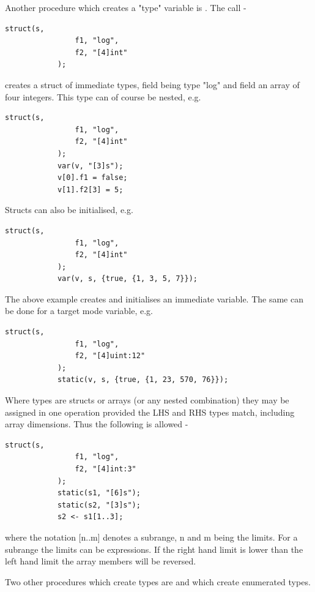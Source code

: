         Another procedure which creates a "type" variable is .
        The call -
        \begin{lstlisting}[language=threepl]
            struct(s,
                f1, "log",
                f2, "[4]int"
            );
        \end{lstlisting}
        creates a struct of immediate types, field  being type "log"
        and field  an array of four integers. This type can of course be
        nested, e.g.
        \begin{lstlisting}[language=threepl]
            struct(s,
                f1, "log",
                f2, "[4]int"
            );
            var(v, "[3]s");
            v[0].f1 = false;
            v[1].f2[3] = 5;
        \end{lstlisting}
        Structs can also be initialised, e.g.
        \begin{lstlisting}[language=threepl]
            struct(s,
                f1, "log",
                f2, "[4]int"
            );
            var(v, s, {true, {1, 3, 5, 7}});
        \end{lstlisting}

        The above example creates and initialises an immediate variable. The same
        can be done for a target mode variable, e.g.
        \begin{lstlisting}[language=threepl]
            struct(s,
                f1, "log",
                f2, "[4]uint:12"
            );
            static(v, s, {true, {1, 23, 570, 76}});
        \end{lstlisting}

        Where types are structs or arrays (or any nested combination) they
        may be assigned in one operation provided the LHS and RHS types match,
        including array dimensions. Thus the following is allowed -
        \begin{lstlisting}[language=threepl]
            struct(s,
                f1, "log",
                f2, "[4]int:3"
            );
            static(s1, "[6]s");
            static(s2, "[3]s");
            s2 <- s1[1..3];
        \end{lstlisting}
        where the notation [n..m] denotes a subrange, n and m being the limits.
        For a subrange the limits can be expressions. If the right hand limit
        is lower than the left hand limit the array members will be reversed.

        Two other procedures which create types are  and 
        which create enumerated types.


